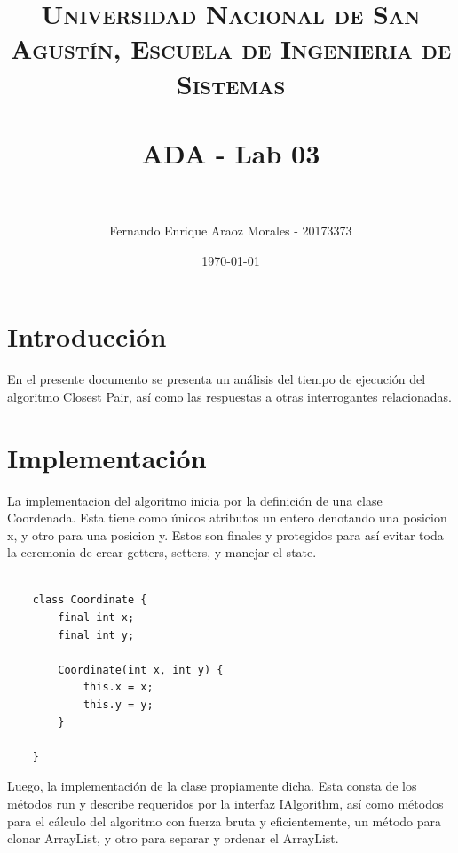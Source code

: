 \documentclass[paper=a4, fontsize=11pt]{scrartcl} %
\title{	
\normalfont \normalsize 
\textsc{Universidad Nacional de San Agustín, Escuela de Ingenieria de Sistemas} \\ [25pt] %
\horrule{0.5pt} \\[0.4cm] %
\huge ADA - Lab 03 \\ %
\horrule{2pt} \\[0.5cm] %
}
\author{Fernando Enrique Araoz Morales - 20173373} %
\date{\normalsize\today} %
\numberwithin{equation}{section} %
\numberwithin{figure}{section} %
\numberwithin{table}{section} %
\begin{document}
\maketitle %


\section{Introducción}\label{sec:introducción}

En el presente documento se presenta un análisis del tiempo de ejecución del algoritmo Closest Pair,
así como las respuestas a otras interrogantes relacionadas.

\section{Implementación}\label{sec:implementación}

La implementacion del algoritmo inicia por la definición de una clase Coordenada. Esta tiene como
únicos atributos un entero denotando una posicion x, y otro para una posicion y.
Estos son finales y protegidos para así evitar toda la ceremonia de crear getters, setters, y
manejar el state.


\begin{lstlisting}

    class Coordinate {
        final int x;
        final int y;

        Coordinate(int x, int y) {
            this.x = x;
            this.y = y;
        }

    }

\end{lstlisting}

Luego, la implementación de la clase propiamente dicha. Esta consta de los métodos run y describe
requeridos por la interfaz IAlgorithm, así como métodos para el cálculo del algoritmo con fuerza
bruta y eficientemente, un método para clonar ArrayList, y otro para separar y ordenar el ArrayList.
\end{document}
